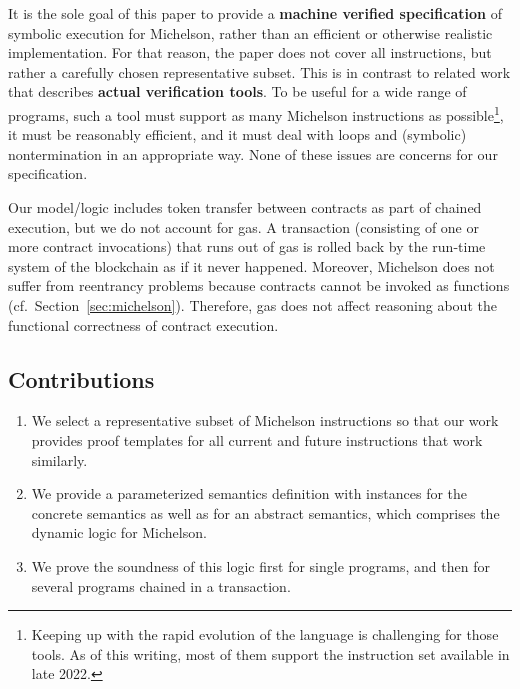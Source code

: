 It is the sole goal of this paper to provide a \textbf{machine
  verified specification} of symbolic execution for Michelson, rather than an
efficient or otherwise realistic implementation. For that reason, the
paper does not cover all instructions, but rather a carefully chosen
representative subset. This is in contrast to related work
\cite{micho,helmholtz,WHYtool} that describes \textbf{actual
verification tools}. To be useful for a wide range of programs, such a
tool must support as many Michelson instructions as
possible\footnote{Keeping up with the rapid evolution of the language is
  challenging for those tools. As of this writing, most of them support the instruction
  set available in late 2022.}, it must
be reasonably efficient, and it must deal with loops and (symbolic)
nontermination in an appropriate way. None of these issues are
concerns for our specification.

Our model/logic includes token transfer between contracts as part of chained
execution, but we do not account for gas.
A transaction (consisting of one or more contract invocations) that
runs out of gas is rolled back by the run-time system of the
blockchain as if it never happened. Moreover, Michelson does not
suffer from reentrancy problems because contracts cannot be invoked as
functions (cf.\ Section~\ref{sec:michelson}).
Therefore, gas does not affect reasoning about the functional correctness of contract execution.

\subsection*{Contributions}
\label{sec:contributions}

\begin{enumerate}
\item We select a representative subset of Michelson
  instructions so that our work provides proof templates for all 
  current and future instructions that work similarly.
\item We provide a parameterized semantics definition with instances
  for the concrete semantics as well as for an abstract semantics,
  which comprises the dynamic logic for Michelson. 
\item We prove the soundness of this logic first for single programs,
  and then for several programs chained in a transaction.
\end{enumerate}

